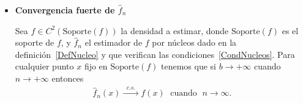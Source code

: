 \begin{itemize}
	\item \textbf{Convergencia fuerte de $\widehat{f}_n$} 

	\begin{theorem}
		\label{ConvFuerte_fn}
		Sea $f \in C^2(\text{Soporte}(f))$ la densidad a estimar, donde $\text{Soporte}(f)$ es el soporte de $f$, y $\widehat{f}_n$ el estimador  de $f$ por núcleos dado en la definición~\ref{DefNucleo} y que verifican las condiciones~\ref{CondNucleos}. Para cualquier punto $x$ fijo en $\text{Soporte}(f)$ tenemos que si $b \to +\infty$ cuando $n \to +\infty$ entonces
		\begin{align}
		\widehat{f}_n(x) \xrightarrow{\;\; c.s. \;\; }f(x) \; \text{ cuando } \; n \rightarrow \infty.
		\label{Consistenciac.s.} 
		\end{align}	
\end{theorem}





\end{itemize}
